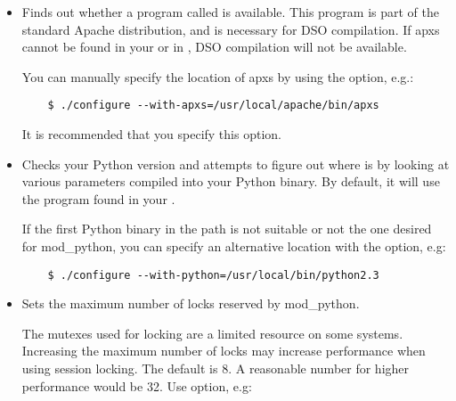 \begin{itemize}

\item
  Finds out whether a program called  is available. This
  program is part of the standard Apache distribution, and is necessary
  for DSO compilation. If apxs cannot be found in your  or in
  , DSO compilation will not be available.

  You can manually specify the location of apxs by using the
   option, e.g.:

  \begin{verbatim}
    $ ./configure --with-apxs=/usr/local/apache/bin/apxs        
  \end{verbatim}

  It is recommended that you specify this option.

\item
  Checks your Python version and attempts to figure out where
   is by looking at various parameters compiled into
  your Python binary. By default, it will use the 
  program found in your .

  If the first Python binary in the path is not suitable or not the one
  desired for mod_python, you can specify an alternative location with the
   option, e.g:

  \begin{verbatim}
    $ ./configure --with-python=/usr/local/bin/python2.3
  \end{verbatim}                      

\item
  Sets the maximum number of locks reserved by mod_python.

  The mutexes used for locking are a limited resource on some
  systems. Increasing the maximum number of locks may increase performance
  when using session locking.  The default is 8. A reasonable number for 
  higher performance would be 32.
  Use  option, e.g:


\end{itemize}
